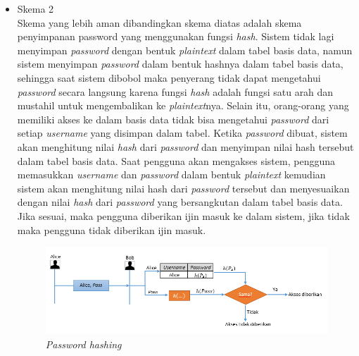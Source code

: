 \begin{itemize}
	\item Skema 2\\
	Skema yang lebih aman dibandingkan skema diatas adalah skema penyimpanan password yang menggunakan fungsi \textit{hash}. Sistem tidak lagi menyimpan \textit{password} dengan bentuk \textit{plaintext} dalam tabel basis data, namun sistem menyimpan \textit{password} dalam bentuk hashnya dalam tabel basis data, sehingga saat sistem dibobol maka penyerang tidak dapat mengetahui \textit{password} secara langsung karena fungsi \textit{hash} adalah fungsi satu arah dan mustahil untuk mengembalikan ke \textit{plaintext}nya. Selain itu, orang-orang yang memiliki akses ke dalam basis data tidak bisa mengetahui \textit{password} dari setiap \textit{username} yang disimpan dalam tabel. Ketika \textit{password} dibuat, sistem akan menghitung nilai \textit{hash} dari \textit{password} dan menyimpan nilai hash tersebut dalam tabel basis data.
Saat pengguna akan mengakses sistem, pengguna memasukkan \textit{username} dan \textit{password} dalam bentuk \textit{plaintext} kemudian sistem akan menghitung nilai hash dari \textit{password} tersebut dan menyesuaikan dengan nilai \textit{hash} dari \textit{password} yang bersangkutan dalam tabel basis data. Jika sesuai, maka pengguna diberikan ijin masuk ke dalam sistem, jika tidak maka pengguna tidak diberikan ijin masuk.
	\begin{figure}[ht]
		\includegraphics[scale=0.7]{Gambar/password_2}
		\centering
		\caption{\textit{Password hashing}}
	\end{figure}
	

\end{itemize}
